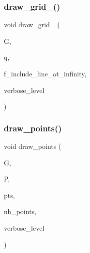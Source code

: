 \subsubsection{\texorpdfstring{draw\+\_\+grid\+\_\+()}{draw\_grid\_()}}
{\footnotesize\ttfamily void draw\+\_\+grid\+\_\+ (\begin{DoxyParamCaption}\item[{\mbox{\hyperlink{classmp__graphics}{mp\+\_\+graphics}} \&}]{G,  }\item[{\mbox{\hyperlink{galois_8h_a09fddde158a3a20bd2dcadb609de11dc}{I\+NT}}}]{q,  }\item[{\mbox{\hyperlink{galois_8h_a09fddde158a3a20bd2dcadb609de11dc}{I\+NT}}}]{f\+\_\+include\+\_\+line\+\_\+at\+\_\+infinity,  }\item[{\mbox{\hyperlink{galois_8h_a09fddde158a3a20bd2dcadb609de11dc}{I\+NT}}}]{verbose\+\_\+level }\end{DoxyParamCaption})}

\mbox{\label{conic_8_c_aee69d86bdad98af95960ee1aa7effa3a}} 
\subsubsection{\texorpdfstring{draw\+\_\+points()}{draw\_points()}}
{\footnotesize\ttfamily void draw\+\_\+points (\begin{DoxyParamCaption}\item[{\mbox{\hyperlink{classmp__graphics}{mp\+\_\+graphics}} \&}]{G,  }\item[{\mbox{\hyperlink{classprojective__space}{projective\+\_\+space}} $\ast$}]{P,  }\item[{\mbox{\hyperlink{galois_8h_a09fddde158a3a20bd2dcadb609de11dc}{I\+NT}} $\ast$}]{pts,  }\item[{\mbox{\hyperlink{galois_8h_a09fddde158a3a20bd2dcadb609de11dc}{I\+NT}}}]{nb\+\_\+points,  }\item[{\mbox{\hyperlink{galois_8h_a09fddde158a3a20bd2dcadb609de11dc}{I\+NT}}}]{verbose\+\_\+level }\end{DoxyParamCaption})}

\mbox{\label{conic_8_c_aba2738ae81f937c578b3555827ebf416}} 
